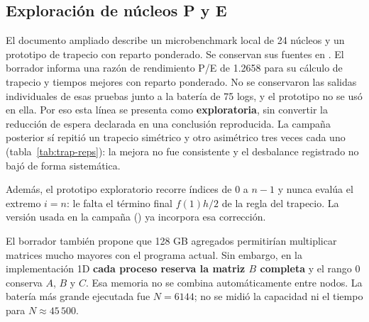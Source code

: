 \subsection{Exploración de núcleos P y E}
El documento ampliado describe un microbenchmark local de 24 núcleos y un prototipo de trapecio con reparto ponderado. Se conservan sus fuentes en . El borrador informa una razón de rendimiento P/E de 1.2658 para su cálculo de trapecio y tiempos mejores con reparto ponderado. No se conservaron las salidas individuales de esas pruebas junto a la batería de 75 logs, y el prototipo no se usó en ella. Por eso esta línea se presenta como \textbf{exploratoria}, sin convertir la reducción de espera declarada en una conclusión reproducida. La campaña posterior sí repitió un trapecio simétrico y otro asimétrico tres veces cada uno (tabla~\ref{tab:trap-reps}): la mejora no fue consistente y el desbalance registrado no bajó de forma sistemática.

Además, el prototipo exploratorio  recorre índices de $0$ a $n-1$ y nunca evalúa el extremo $i=n$: le falta el término final $f(1)h/2$ de la regla del trapecio. La versión usada en la campaña () ya incorpora esa corrección.

El borrador también propone que 128 GB agregados permitirían multiplicar matrices mucho mayores con el programa actual. Sin embargo, en la implementación 1D \textbf{cada proceso reserva la matriz $B$ completa} y el rango 0 conserva $A$, $B$ y $C$. Esa memoria no se combina automáticamente entre nodos. La batería más grande ejecutada fue $N=6144$; no se midió la capacidad ni el tiempo para $N\approx45\,500$.
